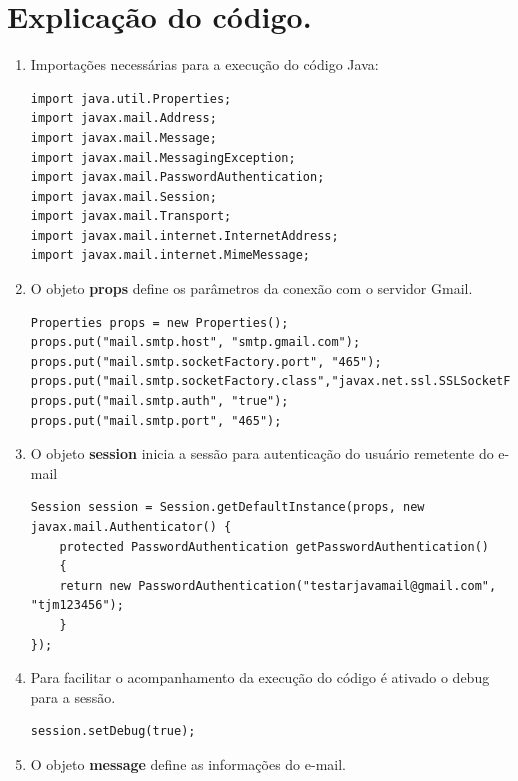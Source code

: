 \documentclass[14pt, a4paper]{article}
\begin{document}
\section{Explicação do código.}

\begin{enumerate}
\item Importações necessárias para a execução do código Java:

\begin{lstlisting}
import java.util.Properties;
import javax.mail.Address;
import javax.mail.Message;
import javax.mail.MessagingException;
import javax.mail.PasswordAuthentication;
import javax.mail.Session;
import javax.mail.Transport;
import javax.mail.internet.InternetAddress;
import javax.mail.internet.MimeMessage;
\end{lstlisting}

\item O objeto \textbf{props} define os parâmetros da conexão com o servidor Gmail.

\begin{lstlisting}
Properties props = new Properties();
props.put("mail.smtp.host", "smtp.gmail.com");
props.put("mail.smtp.socketFactory.port", "465");
props.put("mail.smtp.socketFactory.class","javax.net.ssl.SSLSocketFactory");
props.put("mail.smtp.auth", "true");
props.put("mail.smtp.port", "465");
\end{lstlisting}

\item O objeto \textbf{session} inicia a sessão para autenticação do usuário remetente do e-mail
        
\begin{lstlisting}
Session session = Session.getDefaultInstance(props, new javax.mail.Authenticator() {
	protected PasswordAuthentication getPasswordAuthentication()
	{
	return new PasswordAuthentication("testarjavamail@gmail.com", "tjm123456");
    }
});

\end{lstlisting}

\item Para facilitar o acompanhamento da execução do código é ativado o debug para a sessão.

\begin{lstlisting}          
session.setDebug(true);
\end{lstlisting}                

\item O objeto \textbf{message} define as informações do e-mail.


\end{enumerate}
\end{document}
